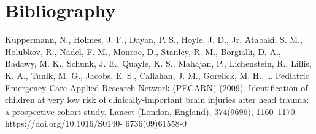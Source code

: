 \documentclass[10pt,letterpaper]{article}
\begin{document}
\section{Bibliography}\label{bibliography}

Kuppermann, N., Holmes, J. F., Dayan, P. S., Hoyle, J. D., Jr, Atabaki, S. M., Holubkov, R., Nadel,
F. M., Monroe, D., Stanley, R. M., Borgialli, D. A., Badawy, M. K., Schunk, J. E., Quayle, K. S.,
Mahajan, P., Lichenstein, R., Lillis, K. A., Tunik, M. G., Jacobs, E. S., Callahan, J. M., Gorelick,
M. H., … Pediatric Emergency Care Applied Research Network (PECARN) (2009). Identification
of children at very low risk of clinically-important brain injuries after head trauma: a prospective
cohort study. Lancet (London, England), 374(9696), 1160–1170. https://doi.org/10.1016/S0140-
6736(09)61558-0
\end{document}
